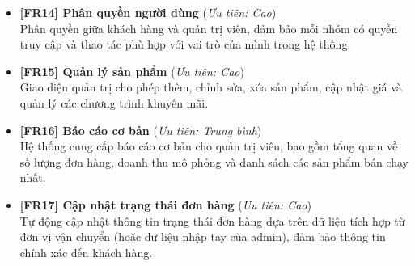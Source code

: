 \begin{itemize}
\item \textbf{[FR14] Phân quyền người dùng} \hfill (\textit{Ưu tiên: Cao})\\
    Phân quyền giữa khách hàng và quản trị viên, đảm bảo mỗi nhóm có quyền truy cập và thao tác phù hợp với vai trò của mình trong hệ thống.

\item \textbf{[FR15] Quản lý sản phẩm} \hfill (\textit{Ưu tiên: Cao})\\
    Giao diện quản trị cho phép thêm, chỉnh sửa, xóa sản phẩm, cập nhật giá và quản lý các chương trình khuyến mãi.

\item \textbf{[FR16] Báo cáo cơ bản} \hfill (\textit{Ưu tiên: Trung bình})\\
    Hệ thống cung cấp báo cáo cơ bản cho quản trị viên, bao gồm tổng quan về số lượng đơn hàng, doanh thu mô phỏng và danh sách các sản phẩm bán chạy nhất.

\item \textbf{[FR17] Cập nhật trạng thái đơn hàng} \hfill (\textit{Ưu tiên: Cao})\\
    Tự động cập nhật thông tin trạng thái đơn hàng dựa trên dữ liệu tích hợp từ đơn vị vận chuyển (hoặc dữ liệu nhập tay của admin), đảm bảo thông tin chính xác đến khách hàng.
    
\end{itemize}
